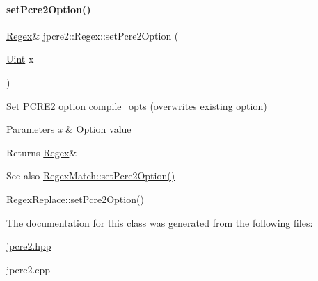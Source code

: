 \paragraph{\texorpdfstring{set\+Pcre2\+Option()}{setPcre2Option()}}
{\footnotesize\ttfamily \hyperlink{classjpcre2_1_1Regex}{Regex}\& jpcre2\+::\+Regex\+::set\+Pcre2\+Option (\begin{DoxyParamCaption}\item[{\hyperlink{namespacejpcre2_a078242d38221a13fb3543b9edd78c099}{Uint}}]{x }\end{DoxyParamCaption})\hspace{0.3cm}{\ttfamily [inline]}}



Set P\+C\+R\+E2 option \hyperlink{classjpcre2_1_1Regex_a5954131e9085de63229ed5c11417df69}{compile\+\_\+opts} (overwrites existing option) 


\begin{DoxyParams}{Parameters}
{\em x} & Option value \\
\hline
\end{DoxyParams}
\begin{DoxyReturn}{Returns}
\hyperlink{classjpcre2_1_1Regex}{Regex}\& 
\end{DoxyReturn}
\begin{DoxySeeAlso}{See also}
\hyperlink{classjpcre2_1_1RegexMatch_ae4ab558c2bec0bc9639dbca70ab47496_ae4ab558c2bec0bc9639dbca70ab47496}{Regex\+Match\+::set\+Pcre2\+Option()} 

\hyperlink{classjpcre2_1_1RegexReplace_aec36272d351fdc3a8cb02a4a3efea5a2_aec36272d351fdc3a8cb02a4a3efea5a2}{Regex\+Replace\+::set\+Pcre2\+Option()} 
\end{DoxySeeAlso}


The documentation for this class was generated from the following files\+:\begin{DoxyCompactItemize}
\item 
\hyperlink{jpcre2_8hpp}{jpcre2.\+hpp}\item 
jpcre2.\+cpp\end{DoxyCompactItemize}
